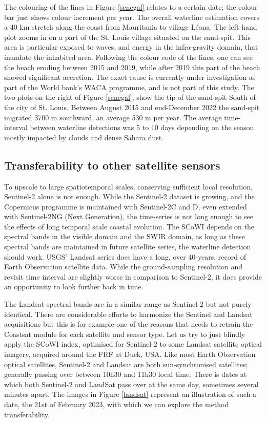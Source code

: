 \documentclass[remotesensing,article,submit,pdftex,moreauthors]{Definitions/mdpi}
\begin{document}
The colouring of the lines in Figure \ref{senegal} relates to a certain date; the colour bar just shows colour increment per year. The overall waterline estimation covers a 40 km stretch along the coast from Mauritania to village L\'{e}ona. The left-hand plot zooms in on a part of the St. Louis village situated on the sand-spit. This area is particular exposed to waves, and energy in the infra-gravity domain, that inundate the inhabited area. Following the colour code of the lines, one can see the beach eroding between 2015 and 2019, while after 2019 this part of the beach showed significant accretion. The exact cause is currently under investigation as part of the World bank's WACA programme, and is not part of this study. The two plots on the right of Figure \ref{senegal}, show the tip of the sand-spit South of the city of St. Louis. Between August 2015 and end-December 2022 the sand-spit migrated 3700 m southward, an average 530 m per year. The average time-interval between waterline detections was 5 to 10 days depending on the season mostly impacted by clouds and dense Sahara dust.
 
\subsection{Transferability to other satellite sensors}

  
To upscale to large spatiotemporal scales, conserving sufficient local resolution, Sentinel-2 alone is not enough. While the Sentinel-2 dataset is growing, and the Copernicus programme is maintained with Sentinel-2C and D, even extended with Sentinel-2NG (Next Generation), the time-series is not long enough to see the effects of long temporal scale coastal evolution. The SCoWI depends on the spectral bands in the visible domain and the SWIR domain, as long as these spectral bands are maintained in future satellite series, the waterline detection should work. USGS' Landsat series does have a long, over 40-years, record of Earth Observation satellite data. While the ground-sampling resolution and revisit time interval are slightly worse in comparison to Sentinel-2, it does provide an opportunity to look further back in time. 

The Landsat spectral bands are in a similar range as Sentinel-2 but not purely identical. There are considerable efforts to harmonize the Sentinel and Landsat acquisitions but this is for example one of the reasons that \citet{VOS2019_google} needs to retrain the Coastsat module for each satellite and sensor type. Let us try to just blindly apply the SCoWI index, optimised for Sentinel-2 to some Landsat satellite optical imagery, acquired around the FRF at Duck, USA. Like most Earth Observation optical satellites, Sentinel-2 and Landsat are both sun-synchronised satellites; generally passing over between 10h30 and 11h30 local time. There is dates at which both Sentinel-2 and LandSat pass over at the same day, sometimes several minutes apart. The images in Figure \ref{landsat} represent an illustration of such a date, the 21st of February 2023, with which we can explore the method transferability.
\end{document}
